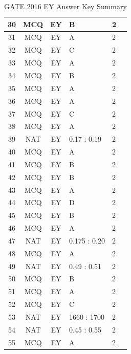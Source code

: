 \documentclass[11pt,a4paper]{article}
\begin{document}
\begin{table}[h!]
\begin{tabular}{|c|c|c|p{1.8cm}|p{2.5cm}|c|}
\hline
30 & MCQ & EY & B         & 2 \\
\hline
31 & MCQ & EY & A         & 2 \\
\hline
32 & MCQ & EY & C         & 2 \\
\hline
33 & MCQ & EY & A         & 2 \\
\hline
34 & MCQ & EY & B         & 2 \\
\hline
35 & MCQ & EY & A         & 2 \\
\hline
36 & MCQ & EY & A         & 2 \\
\hline
37 & MCQ & EY & C         & 2 \\
\hline
38 & MCQ & EY & A         & 2 \\
\hline
39 & NAT & EY & 0.17 : 0.19 & 2 \\
\hline
40 & MCQ & EY & A         & 2 \\
\hline
41 & MCQ & EY & B         & 2 \\
\hline
42 & MCQ & EY & B         & 2 \\
\hline
43 & MCQ & EY & A         & 2 \\
\hline
44 & MCQ & EY & D         & 2 \\
\hline
45 & MCQ & EY & B         & 2 \\
\hline
46 & MCQ & EY & A         & 2 \\
\hline
47 & NAT & EY & 0.175 : 0.20 & 2 \\
\hline
48 & MCQ & EY & A         & 2 \\
\hline
49 & NAT & EY & 0.49 : 0.51  & 2 \\
\hline
50 & MCQ & EY & B         & 2 \\
\hline
51 & MCQ & EY & A         & 2 \\
\hline
52 & MCQ & EY & C         & 2 \\
\hline
53 & NAT & EY & 1660 : 1700 & 2 \\
\hline
54 & NAT & EY & 0.45 : 0.55 & 2 \\
\hline
55 & MCQ & EY & A         & 2 \\
\hline
\end{tabular}
\caption{GATE 2016 EY Answer Key Summary}
\end{table}
\end{document}
